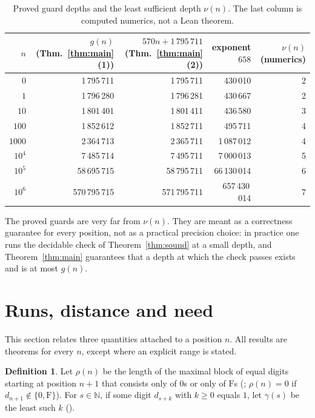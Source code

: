 \documentclass[11pt]{amsart}
\theoremstyle{definition}
\newtheorem{definition}[theorem]{Definition}
\theoremstyle{remark}
\newcommand{\N}{\mathbb{N}}
\newcommand{\need}{\nu}
\newcommand{\run}{\rho}
\newcommand{\gap}{\gamma}
\newcommand{\Bsimple}{1\,795\,711}
\begin{document}
\begin{table}[ht]
\centering
\caption{Proved guard depths and the least sufficient depth $\need(n)$.
The last column is computed numerics, not a Lean theorem.}
\label{tab:guard}
\begin{tabular}{@{}r r r r r@{}}
\toprule
$n$ & $g(n)$ (Thm.~\ref{thm:main}(1)) & $570n+\Bsimple$ (Thm.~\ref{thm:main}(2)) & exponent $658$ & $\need(n)$ (numerics)\\
\midrule
$0$       & 1\,795\,711   & 1\,795\,711   & 430\,010      & 2\\
$1$       & 1\,796\,280   & 1\,796\,281   & 430\,667      & 2\\
$10$      & 1\,801\,401   & 1\,801\,411   & 436\,580      & 3\\
$100$     & 1\,852\,612   & 1\,852\,711   & 495\,711      & 4\\
$1000$    & 2\,364\,713   & 2\,365\,711   & 1\,087\,012   & 4\\
$10^4$    & 7\,485\,714   & 7\,495\,711   & 7\,000\,013   & 5\\
$10^5$    & 58\,695\,715  & 58\,795\,711  & 66\,130\,014  & 6\\
$10^6$    & 570\,795\,715 & 571\,795\,711 & 657\,430\,014 & 7\\
\bottomrule
\end{tabular}
\end{table}

The proved guards are very far from $\need(n)$. They are meant as a
correctness guarantee for every position, not as a practical precision
choice: in practice one runs the decidable check of Theorem~\ref{thm:sound}
at a small depth, and Theorem~\ref{thm:main} guarantees that a depth at which
the check passes exists and is at most $g(n)$.

\section{Runs, distance and need}\label{sec:structure}

This section relates three quantities attached to a position $n$. All
results are theorems for every $n$, except where an explicit range is stated.

\begin{definition}
Let $\run(n)$ be the length of the maximal block of equal digits starting at
position $n+1$ that consists only of $0$s or only of $\mathrm{F}$s
(; $\run(n)=0$ if $d_{n+1}\notin\{0,\mathrm{F}\}$). For
$s\in\N$, if some digit $d_{s+k}$ with $k\ge0$ equals $1$, let $\gap(s)$ be the
least such $k$ ().
\end{definition}
\end{document}
